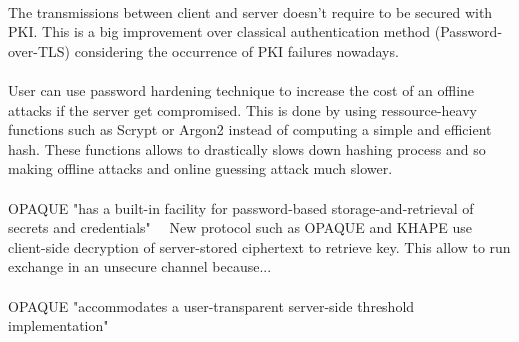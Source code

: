 \documentclass[../report.tex]{subfiles}
\begin{document}
\paragraph{}
The transmissions between client and server doesn't require to be secured with PKI. This is a big improvement over classical authentication method (Password-over-TLS) considering the occurrence of PKI failures nowadays. %

\paragraph{}
User can use password hardening technique to increase the cost of an offline attacks if the server get compromised. This is done by using ressource-heavy functions such as Scrypt \cite{Scrypt_Paper} or Argon2 \cite{Argon2_Paper} instead of computing a simple and efficient hash. These functions allows to drastically slows down hashing process and so making offline attacks and online guessing attack much slower.

\paragraph{}
OPAQUE "has a built-in facility for password-based storage-and-retrieval of secrets and credentials"
~~New protocol such as OPAQUE and KHAPE use client-side decryption of server-stored ciphertext to retrieve key. This allow to run exchange in an unsecure channel because...

\paragraph{}
OPAQUE "accommodates a user-transparent server-side threshold implementation"
\end{document}
